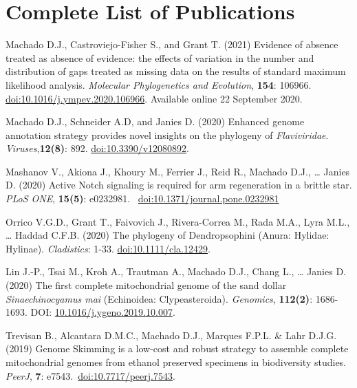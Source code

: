 
\section{Complete List of Publications}

	{
		\setlength{\parskip}{.5em}\renewcommand{\baselinestretch}{2.0}
		\begin{hangparas}{.25in}{1}
    
        Machado D.J., Castroviejo-Fisher S., and Grant T. (2021) Evidence of absence treated as absence of evidence: the effects of variation in the number and distribution of gaps treated as missing data on the results of standard maximum likelihood analysis. \emph{Molecular Phylogenetics and Evolution}, \textbf{154}: 106966. \href{https://doi.org/10.1016/j.ympev.2020.106966}{doi:10.1016/j.ympev.2020.106966}. Available online 22 September 2020.
    
        Machado D.J., Schneider A.D, and Janies D. (2020) Enhanced genome annotation strategy provides novel insights on the phylogeny of \emph{Flaviviridae}. \emph{Viruses},\textbf{12(8)}: 892. \href{https://www.mdpi.com/1999-4915/12/8/892}{doi:10.3390/v12080892}.
	
	    Mashanov V., Akiona J., Khoury M., Ferrier J., Reid R., Machado D.J., … Janies D. (2020) Active Notch signaling is required for arm regeneration in a brittle star. \emph{PLoS ONE}, \textbf{15(5)}: e0232981. ~\href{https://doi.org/10.1371/journal.pone.0232981}{doi:10.1371/journal.pone.0232981}
	    
	    Orrico V.G.D., Grant T., Faivovich J., Rivera-Correa M., Rada M.A., Lyra M.L., … Haddad C.F.B. (2020) The phylogeny of Dendropsophini (Anura: Hylidae: Hylinae). \emph{Cladistics}: 1-33. \href{https://onlinelibrary.wiley.com/doi/abs/10.1111/cla.12429}{doi:10.1111/cla.12429}.
	    
	    Lin J.-P., Tsai M., Kroh A., Trautman A., Machado D.J., Chang L., … Janies D. (2020) The first complete mitochondrial genome of the sand dollar \emph{Sinaechinocyamus mai} (Echinoidea: Clypeasteroida). \emph{Genomics}, \textbf{112(2)}: 1686-1693. DOI: \href{https://doi.org/10.1016/j.ygeno.2019.10.007}{10.1016/j.ygeno.2019.10.007}.
	
		Trevisan B., Alcantara D.M.C., Machado D.J., Marques F.P.L. \& Lahr D.J.G. (2019) Genome Skimming is a low-cost and robust strategy to assemble complete mitochondrial genomes from ethanol preserved specimens in biodiversity studies. \emph{PeerJ}, \textbf{7}: e7543.~\href{https://doi.org/10.7717/peerj.7543}{doi:10.7717/peerj.7543}.


\end{hangparas}}

